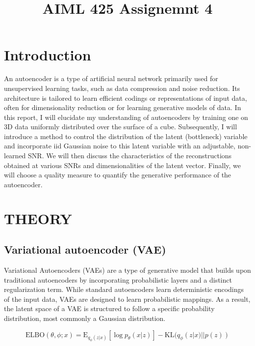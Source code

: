 \documentclass{article}
\title{AIML 425 Assignemnt 4}
\begin{document}
%
\maketitle
%
\section{Introduction}
\label{sec:intro}

An autoencoder is a type of artificial neural network primarily used for unsupervised learning tasks, such as data compression and noise reduction. Its architecture is tailored to learn efficient codings or representations of input data, often for dimensionality reduction or for learning generative models of data. In this report, I will elucidate my understanding of autoencoders by training one on 3D data uniformly distributed over the surface of a cube. Subsequently, I will introduce a method to control the distribution of the latent (bottleneck) variable and incorporate iid Gaussian noise to this latent variable with an adjustable, non-learned SNR. We will then discuss the characteristics of the reconstructions obtained at various SNRs and dimensionalities of the latent vector. Finally, we will choose a quality measure to quantify the generative performance of the autoencoder.

\section{THEORY}
\label{sec:theory}

\subsection{Variational autoencoder (VAE)}
\label{ssec:vae}

Variational Autoencoders (VAEs) \cite{kingma2013auto} are a type of generative model that builds upon traditional autoencoders by incorporating probabilistic layers and a distinct regularization term. While standard autoencoders learn deterministic encodings of the input data, VAEs are designed to learn probabilistic mappings. As a result, the latent space of a VAE is structured to follow a specific probability distribution, most commonly a Gaussian distribution.

\begin{equation}
  \text{ELBO}(\theta, \phi; x) = \text{E}_{q_\phi(z|x)}[\log p_\theta(x|z)] - \text{KL}(q_\phi(z|x) || p(z))
  \end{equation}
  
\end{document}
